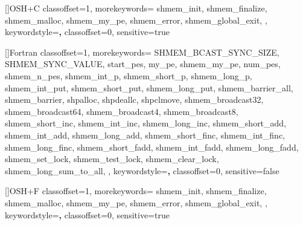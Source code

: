 []{OSH+C}{
  classoffset=1,
  morekeywords={
    shmem_init,
    shmem_finalize,
    shmem_malloc,
    shmem_my_pe,
    shmem_error,
    shmem_global_exit,
  },
  keywordstyle=\color{black}\textbf,
  classoffset=0,
  sensitive=true
}

[]{Fortran}{
  classoffset=1,
  morekeywords={
    SHMEM_BCAST_SYNC_SIZE, SHMEM_SYNC_VALUE,
    start_pes,
    my_pe, shmem_my_pe,
    num_pes, shmem_n_pes,
    shmem_int_p, shmem_short_p, shmem_long_p,
    shmem_int_put, shmem_short_put, shmem_long_put,
    shmem_barrier_all, shmem_barrier,
    shpalloc,  shpdeallc, shpclmove,
    shmem_broadcast32, shmem_broadcast64,
    shmem_broadcast4, shmem_broadcast8,
    shmem_short_inc, shmem_int_inc, shmem_long_inc,
    shmem_short_add, shmem_int_add, shmem_long_add,
    shmem_short_finc, shmem_int_finc, shmem_long_finc,
    shmem_short_fadd, shmem_int_fadd, shmem_long_fadd,
    shmem_set_lock, shmem_test_lock, shmem_clear_lock,
    shmem_long_sum_to_all,
  },
  keywordstyle=\color{black}\textbf,
  classoffset=0,
  sensitive=false
}

[]{OSH+F}{
  classoffset=1,
  morekeywords={
    shmem_init,
    shmem_finalize,
    shmem_malloc,
    shmem_my_pe,
    shmem_error,
    shmem_global_exit,
  },
  keywordstyle=\color{black}\textbf,
  classoffset=0,
  sensitive=true
}

%
%

%
%

\newcommand{\strikeline}[1][red]{{\color{#1}\raisebox{.5ex}{\rule{1em}{.4pt}}}}
\newcommand{\stretchline}[1][red]{\xrfill[.5ex]{.4pt}[#1]}
\newcommand{\DeprecationStart}[1][red]{{\color{#1} deprecation start} \mbox{}}
\newcommand{\DeprecationEnd}[1][red]{{\color{#1} deprecation end} \mbox{}}

\newcommand{\StartDeprecateBlock}{
  {\strikeline\mbox{} \DeprecationStart \stretchline\mbox{}}}
\newcommand{\EndDeprecateBlock}{%
  \mbox{}\stretchline\mbox{} \DeprecationEnd \strikeline}
\newenvironment{DeprecateBlock}{%
  \par \StartDeprecateBlock \par}{\par \EndDeprecateBlock \par}

\newcommand{\StartInlineDeprecate}{%
  \strikeline\mbox{} \DeprecationStart \strikeline \mbox{}}
\newcommand{\EndInlineDeprecate}{%
  \strikeline\mbox{} \DeprecationEnd \strikeline}
\newenvironment{DeprecateInline}{\StartInlineDeprecate}{\EndInlineDeprecate}


